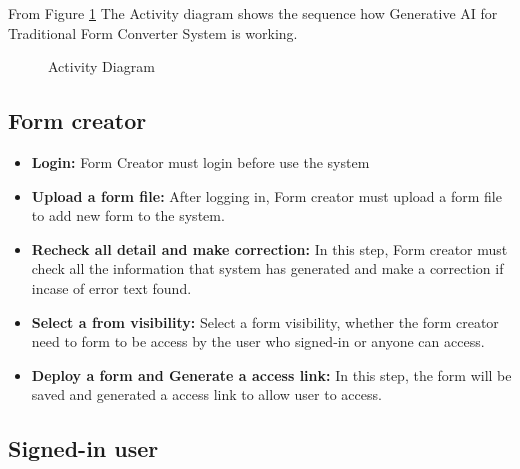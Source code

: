 \documentclass[12pt,oneside,openright,a4paper]{cpe-english-project}
\begin{document}
From Figure \ref{fig:activity-diagram} The Activity diagram shows the sequence how Generative AI for
Traditional Form Converter System is working.

\begin{figure}[!h]
\centering
{}
\caption{Activity Diagram}\label{fig:activity-diagram}
\end{figure}

\subsection{Form creator}

\begin{itemize}
\item  \textbf{Login:} Form Creator must login before use the system
\item  \textbf{Upload a form file:} After logging in, Form creator must upload a form file to add new form to the system.
\item  \textbf{Recheck all detail and make correction:} In this step, Form creator must check all the information that system has generated and make a correction if incase of error text found.
\item  \textbf{Select a from visibility:} Select a form visibility, whether the form creator need to form to be access by the user who signed-in or anyone can access.
\item  \textbf{Deploy a form and Generate a access link:} In this step, the form will be saved and generated a access link to allow user to access.

\end{itemize}


\subsection{Signed-in user}
\end{document}
